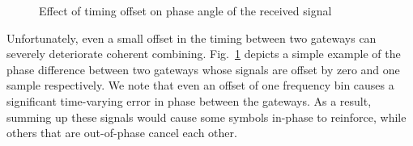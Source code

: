 

\begin{figure}[!htb]
\centering
\compactimg
{}
\hfill
{}
\vspace{-10pt}
\caption{Effect of timing offset on phase angle of the received signal}
\label{fig:toffset}
\vspace{-10pt}
\end{figure}

Unfortunately, even a small offset in the timing between two gateways can
severely deteriorate coherent combining. Fig.~\ref{fig:toffset} depicts a
simple example of the phase difference between two gateways whose signals are
offset by zero and one sample respectively. We note that even an offset of one
frequency bin causes a significant time-varying error in phase between the
gateways. As a result, summing up these signals would cause some symbols
in-phase to reinforce, while others that are out-of-phase cancel each other.
\vspace*{0.1in}

